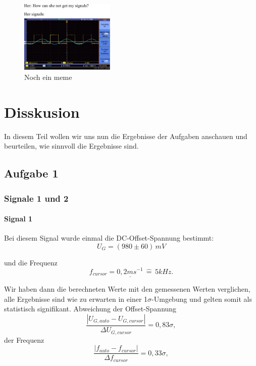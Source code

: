 \begin{figure}
    \centering
    \includegraphics[width=0.4\textwidth]{img/25/memes/missedSignals.pdf}
    \caption{Noch ein meme}
\end{figure}

\section{Disskusion}
In diesem Teil wollen wir uns nun die Ergebnisse der Aufgaben anschauen und beurteilen, wie sinnvoll die Ergebnisse sind.
\subsection*{Aufgabe 1}
\subsubsection*{Signale 1 und 2}
\paragraph{Signal 1} Bei diesem Signal wurde einmal die DC-Offset-Spannung bestimmt:
\begin{equation}
    \boxed{
        U_{G} = (980 \pm 60) \, mV
    }
\end{equation}

und die Frequenz
\begin{equation}
    \underline{
        f_{cursor} = 0,2 ms^{-1} \, \hat= \, 5kHz
    }.
\end{equation}

Wir haben dann die berechneten Werte mit den gemessenen Werten verglichen, alle Ergebnisse sind wie zu erwarten in einer 1$\sigma$-Umgebung und gelten somit als statistisch signifikant.
Abweichung der Offset-Spannung
\begin{equation}
    \frac{\left| U_{G,auto} - U_{G,cursor} \right|}{\Delta U_{G,cursor}} = 0,83\sigma,
\end{equation}
der Frequenz
\begin{equation}
    \frac{\left| f_{auto} - f_{cursor} \right|}{\Delta f_{cursor}} = 0,33\sigma,
\end{equation}


